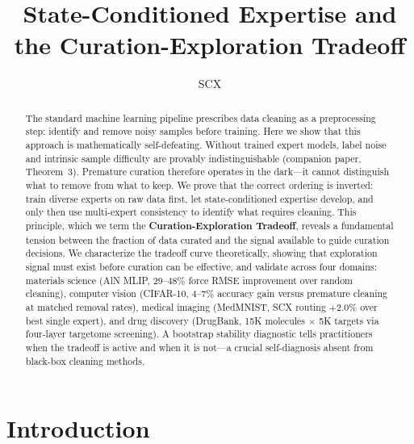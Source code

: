 %

\title{State-Conditioned Expertise and the Curation-Exploration Tradeoff}

\author{SCX}



\maketitle

\begin{abstract}
The standard machine learning pipeline prescribes data cleaning as a preprocessing step: identify and remove noisy samples before training. Here we show that this approach is mathematically self-defeating. Without trained expert models, label noise and intrinsic sample difficulty are provably indistinguishable (companion paper, Theorem~3). Premature curation therefore operates in the dark---it cannot distinguish what to remove from what to keep. We prove that the correct ordering is inverted: train diverse experts on raw data first, let state-conditioned expertise develop, and only then use multi-expert consistency to identify what requires cleaning. This principle, which we term the \textbf{Curation-Exploration Tradeoff}, reveals a fundamental tension between the fraction of data curated and the signal available to guide curation decisions. We characterize the tradeoff curve theoretically, showing that exploration signal must exist before curation can be effective, and validate across four domains: materials science (AlN MLIP, 29--48\% force RMSE improvement over random cleaning), computer vision (CIFAR-10, 4--7\% accuracy gain versus premature cleaning at matched removal rates), medical imaging (MedMNIST, SCX routing +2.0\% over best single expert), and drug discovery (DrugBank, 15K molecules $\times$ 5K targets via four-layer targetome screening). A bootstrap stability diagnostic tells practitioners when the tradeoff is active and when it is not---a crucial self-diagnosis absent from black-box cleaning methods.
\end{abstract}

\section{Introduction}

